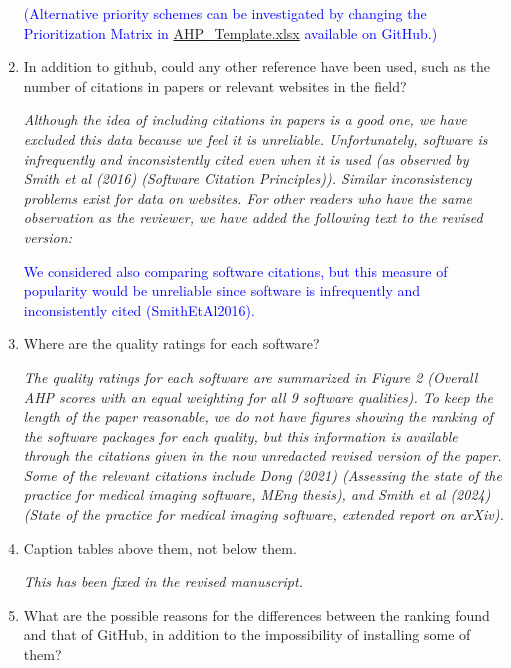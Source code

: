 \documentclass[12pt]{casletter}
\begin{document}
\begin{letter}
\begin{enumerate}
  \textcolor{blue}{(Alternative priority schemes can be investigated by changing
the Prioritization Matrix in
\href{https://github.com/smiths/AIMSS/blob/master/StateOfPractice/AHP2021/MedicalImaging/AHP_Template.xlsx}
{AHP\_Template.xlsx} available on GitHub.)}

  \item In addition to github, could any other reference have been used, such as
  the number of citations in papers or relevant websites in the field? \medskip

  \emph{Although the idea of including citations in papers is a good one, we
  have excluded this data because we feel it is unreliable.  Unfortunately,
  software is infrequently and inconsistently cited even when it is used (as
  observed by Smith et al (2016) (Software Citation Principles)).  Similar
  inconsistency problems exist for data on websites.  For other readers who have
  the same observation as the reviewer, we have added the following text to the
  revised version: \smallskip}

  \textcolor{blue}{We considered also comparing software citations, but this
  measure of popularity would be unreliable since software is infrequently and
  inconsistently cited (SmithEtAl2016).}

  \item Where are the quality ratings for each software? \medskip

  \emph{The quality ratings for each software are summarized in Figure 2
  (Overall AHP scores with an equal weighting for all 9 software qualities). To
  keep the length of the paper reasonable, we do not have figures showing the
  ranking of the software packages for each quality, but this information is
  available through the citations given in the now unredacted revised version of the
  paper.  Some of the relevant citations include Dong (2021) (Assessing the
  state of the practice for medical imaging software, MEng thesis), and Smith et
  al (2024) (State of the practice for medical imaging software, extended report
  on arXiv). \smallskip}

  \item Caption tables above them, not below them. \medskip

  \emph{This has been fixed in the revised manuscript. \smallskip}

  \item What are the possible reasons for the differences between the ranking
  found and that of GitHub, in addition to the impossibility of installing some
  of them? \medskip


\end{enumerate}
\end{letter}
\end{document}

